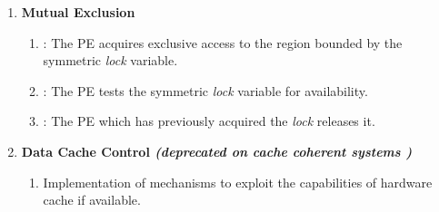 \begin{enumerate}
\item \textbf{Mutual Exclusion}
\begin{enumerate}
\item {}: The \ac{PE} acquires exclusive access to the region bounded by the symmetric \textit{lock} variable.
\item {}: The \ac{PE} tests the symmetric \textit{lock} variable for availability.
\item {}: The \ac{PE} which has previously acquired the \textit{lock} releases it.
\end{enumerate}

\item \textbf{Data Cache Control \textit{(deprecated on cache coherent systems )}}
\begin{enumerate}
\item Implementation of mechanisms to exploit the capabilities of hardware
cache if available.
\end{enumerate}
\end{enumerate}

